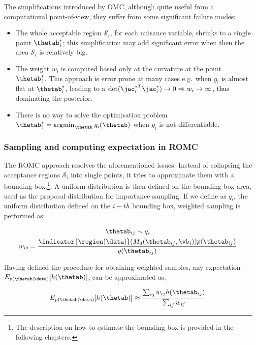 The simplifications introduced by OMC, although quite useful from a
computational point-of-view, they suffer from some significant failure modes:

\begin{itemize}
\item The whole acceptable region $\mathcal{S}_i$, for each nuisance variable,
  shrinks to a single point $\thetab_i^*$; this simplification may add
  significant error when then the area $\mathcal{S}_i$ is relatively big.
\item The weight $w_i$ is computed based only at the curvature at the
  point $\thetab_i^*$. This approach is error prone at many cases
  e.g.\ when $g_i$ is almost flat at $\thetab_i^*$, leading to a
  $\text{det}(\jac_i^{*T}\jac_i^*) \rightarrow 0 \Rightarrow w_i
  \rightarrow \infty$, thus dominating the posterior.
\item There is no way to solve the optimisation problem
  $\thetab_i^* = \text{argmin}_{\thetab} \: g_i(\thetab)$ when $g_i$
  is not differentiable.
\end{itemize}


\subsubsection{Sampling and computing expectation in ROMC}

The ROMC approach resolves the aforementioned issues. Instead of
collapsing the acceptance regions $\mathcal{S}_i$ into single points,
it tries to approximate them with a bounding box.\footnote{The
  description on how to estimate the bounding box is provided in the
  following chapters.}. A uniform distribution is then defined on the
bounding box area, used as the proposal distribution for importance
sampling. If we define as $q_i$, the uniform distribution defined on
the $i-th$ bounding box, weighted sampling is performed as:

\begin{gather}
  \label{eq:sampling}
  \thetab_{ij} \sim q_i \\
  w_{ij} = \frac{\indicator{\region(\data)}(M_d(\thetab_{ij}, \vb_i)) p(\thetab_{ij})}{q(\thetab_{ij})}
\end{gather}

\noindent
Having defined the procedure for obtaining weighted samples, any
expectation $E_{p(\thetab|\data)}[h(\thetab)]$, can be approximated
as,

\begin{equation} \label{eq:expectation}
  E_{p(\thetab|\data)}[h(\thetab)] \approx \frac{\sum_{ij} w_{ij} h(\thetab_{ij})}{\sum_{ij} w_{ij}}
\end{equation}



